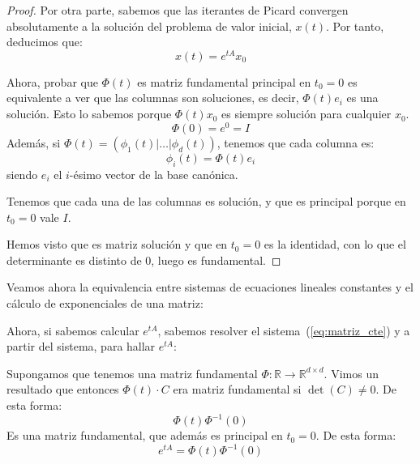\begin{prop}
\begin{proof}
        Por otra parte, sabemos que las iterantes de Picard convergen absolutamente a la solución del problema de valor inicial, $x(t)$. Por tanto, deducimos que:
        \begin{equation*}
            x(t) = e^{tA} x_0
        \end{equation*}

        Ahora, probar que $\Phi(t)$ es matriz fundamental principal en $t_0=0$  es equivalente a ver que las columnas son soluciones, es decir, $\Phi(t)e_i$ es una solución. Esto lo sabemos porque $\Phi(t)x_0$ es siempre solución para cualquier $x_0$.
        \begin{equation*}
            \Phi(0) = e^0 = I
        \end{equation*}
        Además, si $\Phi(t) = (\phi_1(t)|\ldots|\phi_d(t))$, tenemos que cada columna es:
        \begin{equation*}
            \phi_i(t) = \Phi(t)e_i
        \end{equation*}
        siendo $e_i$ el $i$-ésimo vector de la base canónica.

        Tenemos que cada una de las columnas es solución, y que es principal porque en $t_0=0$ vale $I$.

        Hemos visto que es matriz solución y que en $t_0=0$ es la identidad, con lo que el determinante es distinto de 0, luego es fundamental.
    \end{proof}
\end{prop}
Veamos ahora la equivalencia entre sistemas de ecuaciones lineales constantes y el cálculo de exponenciales de una matriz:

Ahora, si sabemos calcular $e^{tA}$, sabemos resolver el sistema~(\ref{eq:matriz_cte}) y a partir del sistema, para hallar $e^{tA}$:

Supongamos que tenemos una matriz fundamental $\Phi:\mathbb{R}\rightarrow\mathbb{R}^{d\times d}$. Vimos un resultado que entonces $\Phi(t)\cdot C$ era matriz fundamental si $\det(C)\neq 0$. De esta forma:
\begin{equation*}
    \Phi(t)\Phi^{-1}(0) 
\end{equation*}
Es una matriz fundamental, que además es principal en $t_0=0$. De esta forma:
\begin{equation*}
    e^{tA} = \Phi(t)\Phi^{-1}(0)
\end{equation*}

